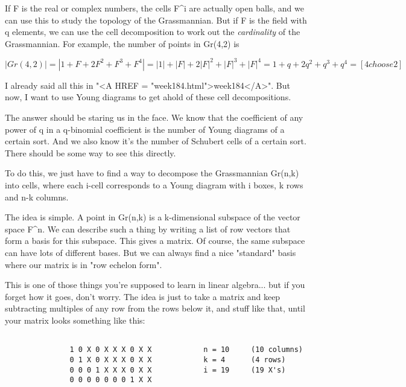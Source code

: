If F is the real or complex numbers, the cells F^{i} are actually open
balls, and we can use this to study the topology of the Grassmannian. 
But if F is the field with q elements, we can use the cell decomposition
to work out the \emph{cardinality} of the Grassmannian.  For example, the
number of points in Gr(4,2) is


$$

|Gr(4,2)| = |1  +  F  + 2F^{2}   +  F^{3} +   F^{4}|

          = |1| + |F| + 2|F|^{2} + |F|^{3} + |F|^{4}

          =  1  +  q  +  2q^{2}  +  q^{3}  +  q^{4}
 
          = [4 choose 2]
$$
    
I already said all this in "<A HREF =
"week184.html">week184</A>".  But now, I want to use Young diagrams
to get ahold of these cell decompositions.

The answer should be staring us in the face.  We know that the
coefficient of any power of q in a q-binomial coefficient is the number
of Young diagrams of a certain sort.  And we also know it's the number of
Schubert cells of a certain sort.  There should be some way to see this
directly.

To do this, we just have to find a way to decompose the Grassmannian Gr(n,k)
into cells, where each i-cell corresponds to a Young diagram with i boxes, 
k rows and n-k columns.

The idea is simple.  A point in Gr(n,k) is a k-dimensional subspace of
the vector space F^{n}.  
We can describe such a thing by writing a list of
row vectors that form a basis for this subspace.  This gives a matrix.
Of course, the same subspace can have lots of different bases.  But we
can always find a nice "standard" basis where our matrix is in
"row echelon form".

This is one of those things you're supposed to learn in linear algebra... 
but if you forget how it goes, don't worry.  The idea is just to take a
matrix and keep subtracting multiples of any row from the rows below it,
and stuff like that, until your matrix looks something like this:
               

\begin{verbatim}

               1 0 X 0 X X X 0 X X            n = 10     (10 columns)
               0 1 X 0 X X X 0 X X            k = 4      (4 rows)
               0 0 0 1 X X X 0 X X            i = 19     (19 X's)
               0 0 0 0 0 0 0 1 X X
\end{verbatim}
    
